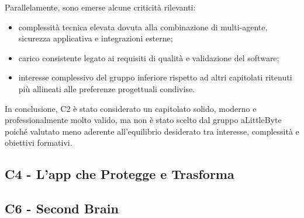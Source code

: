 \documentclass[a4paper,12pt]{article}
\begin{document}
Parallelamente, sono emerse alcune criticità rilevanti:

\begin{itemize}
    \item complessità tecnica elevata dovuta alla combinazione di multi-agente, sicurezza applicativa e integrazioni esterne;
    \item carico consistente legato ai requisiti di qualità e validazione del software;
    \item interesse complessivo del gruppo inferiore rispetto ad altri capitolati ritenuti più allineati alle preferenze progettuali condivise.
\end{itemize}

In conclusione, C2 è stato considerato un capitolato solido, moderno e professionalmente molto valido, ma non è stato scelto dal gruppo aLittleByte poiché valutato meno aderente all'equilibrio desiderato tra interesse, complessità e obiettivi formativi.

\subsection{C4 - L'app che Protegge e Trasforma}
\subsection{C6 - Second Brain}
\end{document}
